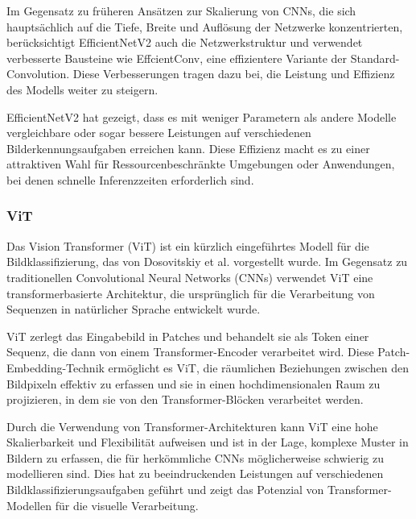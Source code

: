 Im Gegensatz zu früheren Ansätzen zur Skalierung von CNNs, die sich hauptsächlich auf die Tiefe, Breite und Auflösung der Netzwerke konzentrierten, berücksichtigt EfficientNetV2 auch die Netzwerkstruktur und verwendet verbesserte Bausteine wie EffcientConv, eine effizientere Variante der Standard-Convolution. Diese Verbesserungen tragen dazu bei, die Leistung und Effizienz des Modells weiter zu steigern.

EfficientNetV2 hat gezeigt, dass es mit weniger Parametern als andere Modelle vergleichbare oder sogar bessere Leistungen auf verschiedenen Bilderkennungsaufgaben erreichen kann. Diese Effizienz macht es zu einer attraktiven Wahl für Ressourcenbeschränkte Umgebungen oder Anwendungen, bei denen schnelle Inferenzzeiten erforderlich sind.

\subsubsection{ViT}
Das Vision Transformer (ViT) ist ein kürzlich eingeführtes Modell für die Bildklassifizierung, das von Dosovitskiy et al. \cite{dosovitskiy_image_2021} vorgestellt wurde. Im Gegensatz zu traditionellen Convolutional Neural Networks (CNNs) verwendet ViT eine transformerbasierte Architektur, die ursprünglich für die Verarbeitung von Sequenzen in natürlicher Sprache entwickelt wurde.

ViT zerlegt das Eingabebild in Patches und behandelt sie als Token einer Sequenz, die dann von einem Transformer-Encoder verarbeitet wird. Diese Patch-Embedding-Technik ermöglicht es ViT, die räumlichen Beziehungen zwischen den Bildpixeln effektiv zu erfassen und sie in einen hochdimensionalen Raum zu projizieren, in dem sie von den Transformer-Blöcken verarbeitet werden.

Durch die Verwendung von Transformer-Architekturen kann ViT eine hohe Skalierbarkeit und Flexibilität aufweisen und ist in der Lage, komplexe Muster in Bildern zu erfassen, die für herkömmliche CNNs möglicherweise schwierig zu modellieren sind. Dies hat zu beeindruckenden Leistungen auf verschiedenen Bildklassifizierungsaufgaben geführt und zeigt das Potenzial von Transformer-Modellen für die visuelle Verarbeitung.